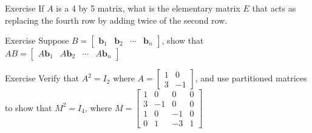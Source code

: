 \documentclass{beamer}
\theoremstyle{definition}
\theoremstyle{remark}
\begin{document}
\begin{frame}[t]{Exercise}
If $A$ is a 4 by 5 matrix, what is the elementary matrix $E$ that acts as replacing the fourth row by adding twice of the second row.
\end{frame}

\begin{frame}[t]{Exercise}
Suppose $B=\begin{bmatrix}
\mathbf b_1&\mathbf b_2&\cdots&\mathbf b_n
\end{bmatrix}$, show that $AB=\begin{bmatrix}
A\mathbf b_1&A\mathbf b_2&\cdots&A\mathbf b_n
\end{bmatrix}$
\end{frame}

\begin{frame}[t]{Exercise}
Verify that $A^2=I_2$ where $A=\begin{bmatrix}
1&0\\3&-1
\end{bmatrix}$, and use partitioned matrices to show that $M^2=I_4$, where $M=\begin{bmatrix}
1&0&0&0\\
3&-1&0&0\\
1&0&-1&0\\
0&1&-3&1
\end{bmatrix}$
\end{frame}


\end{document}
